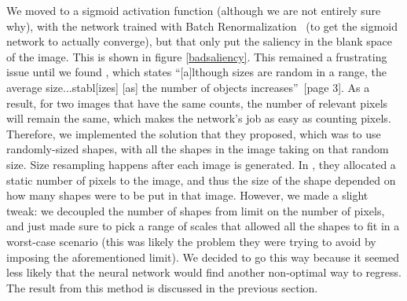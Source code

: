 We moved to a sigmoid activation function (although we are not entirely sure why), with the network
trained with Batch Renormalization~\cite{ioffe2017batch} (to get the sigmoid network to actually
converge), but that only put the saliency in the blank space of the image. This is shown in figure
\ref{badsaliency}. This remained a frustrating issue until we found \cite{guan2021understanding},
which states ``[a]lthough sizes are random in a range, the average size...stabl[izes] [as] the
number of objects increases''~\cite{guan2021understanding}[page 3]. As a result, for two images that
have the same counts, the number of relevant pixels will remain the same, which makes the network's
job as easy as counting pixels. Therefore, we implemented the solution that they proposed, which was
to use randomly-sized shapes, with all the shapes in the image taking on that random size. Size
resampling happens after each image is generated. In \cite{guan2021understanding}, they allocated a
static number of pixels to the image, and thus the size of the shape depended on how many shapes
were to be put in that image. However, we made a slight tweak: we decoupled the number of shapes
from limit on the number of pixels, and just made sure to pick a range of scales that allowed all
the shapes to fit in a worst-case scenario (this was likely the problem they were trying to avoid by
imposing the aforementioned limit). We decided to go this way because it seemed less likely that the
neural network would find another non-optimal way to regress. The result from this method is
discussed in the previous section.

